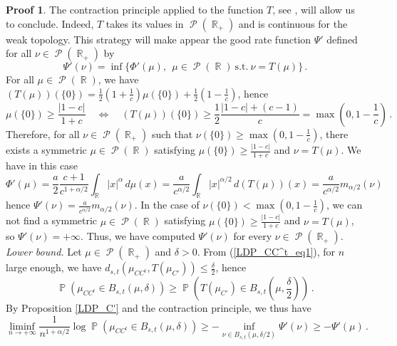 \documentclass[11pt,a4paper]{article}
\DeclareMathOperator{\R}{\mathbb{R}}
\DeclareMathOperator{\PR}{\mathbb{P}}
\DeclareMathOperator{\PP}{\mathcal{P}}
\DeclareMathOperator{\1}{\mathbf{1}}
\theoremstyle{definition}
\newtheorem*{Proof}{Proof}
\begin{document}
\begin{Proof}
The contraction principle applied to the function $T$, see \cite[Theorem 4.2.1]{DZ}, will allow us to conclude. Indeed, $T$ takes its values in $\PP(\R_+)$ and is continuous for the weak topology. This strategy will make appear the good rate function $\Psi'$ defined for all $\nu \in \PP(\R_+)$ by
\begin{displaymath}
\Psi'(\nu) = \inf \{ \Phi'(\mu), \ \ \mu \in \PP(\R) \ \textrm{s.t.} \ \nu = T(\mu) \} \, .
\end{displaymath}
For all $\mu \in \PP(\R)$, we have $(T(\mu))(\{0\}) = \frac12 \left( 1+\frac1c \right) \mu(\{0\}) + \frac12 \left( 1-\frac1c \right)$, hence
\begin{displaymath}
\mu(\{0\}) \ge \frac{|1-c|}{1+c} \quad \Leftrightarrow \quad (T(\mu))(\{0\}) \ge \frac12 \frac{|1-c|+(c-1)}{c} = \max \left( 0,1-\frac1c \right) \, .
\end{displaymath}
Therefore, for all $\nu \in \PP(\R_+)$ such that $\nu(\{0\}) \ge \max \left( 0,1-\frac1c \right)$, there exists a symmetric $\mu \in \PP(\R)$ satisfying $\mu(\{0\}) \ge \frac{|1-c|}{1+c}$ and $\nu = T(\mu)$. We have in this case
\begin{displaymath}
\Phi'(\mu) = \frac{a}{2} \frac{c+1}{c^{1+\alpha/2}} \int_{\R} |x|^{\alpha} \, d\mu(x) = \frac{a}{c^{\alpha/2}} \int_{\R} |x|^{\alpha/2} \, d(T(\mu))(x) = \frac{a}{c^{\alpha/2}} m_{\alpha/2}(\nu)
\end{displaymath}
hence $\Psi'(\nu) = \frac{a}{c^{\alpha/2}} m_{\alpha/2}(\nu)$. In the case of $\nu(\{0\}) < \max \left( 0,1-\frac1c \right)$, we can not find a symmetric $\mu \in \PP(\R)$ satisfying $\mu(\{0\}) \ge \frac{|1-c|}{1+c}$ and $\nu = T(\mu)$, so $\Psi'(\nu) = +\infty$. Thus, we have computed $\Psi'(\nu)$ for every $\nu \in \PP(\R_+)$.\\

\emph{Lower bound.} Let $\mu \in \PP(\R_+)$ and $\delta>0$. From (\ref{LDP_CC^t_eq1}), for $n$ large enough, we have $d_{s,t}(\mu_{CC^t},T(\mu_{C'})) \le \frac{\delta}{2}$, hence
\begin{displaymath}
\PR(\mu_{CC^t} \in B_{s,t}(\mu,\delta)) \ge \PR \left( T(\mu_{C'}) \in B_{s,t} \left( \mu,\frac{\delta}{2} \right) \right) \, .
\end{displaymath}
By Proposition \ref{LDP_C'} and the contraction principle, we thus have
\begin{equation} \label{LDP_CC^t_eq2}
\liminf_{n \to +\infty} \frac{1}{n^{1+\alpha/2}} \log \PR(\mu_{CC^t} \in B_{s,t}(\mu,\delta)) \ge - \inf_{\nu \in B_{s,t}(\mu,\delta/2)} \Psi'(\nu) \ge -\Psi'(\mu) \, .
\end{equation}\\


\end{Proof}
\end{document}
